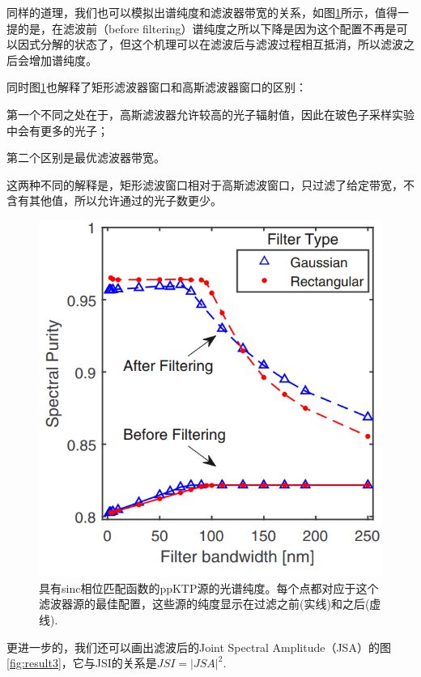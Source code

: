 同样的道理，我们也可以模拟出谱纯度和滤波器带宽的关系，如图\ref{fig:result2}所示，值得一提的是，在滤波前（before filtering）谱纯度之所以下降是因为这个配置不再是可以因式分解的状态了，但这个机理可以在滤波后与滤波过程相互抵消，所以滤波之后会增加谱纯度。

同时图\ref{fig:result2}也解释了矩形滤波器窗口和高斯滤波器窗口的区别：

第一个不同之处在于，高斯滤波器允许较高的光子辐射值，因此在玻色子采样实验中会有更多的光子；

第二个区别是最优滤波器带宽。

这两种不同的解释是，矩形滤波窗口相对于高斯滤波窗口，只过滤了给定带宽，不含有其他值，所以允许通过的光子数更少。

\begin{figure}[ht]
	\centering
	\includegraphics[scale=0.5]{pic/result2}
	\caption{具有sinc相位匹配函数的ppKTP源的光谱纯度。每个点都对应于这个滤波器源的最佳配置，这些源的纯度显示在过滤之前(实线)和之后(虚线).}
	\label{fig:result2}
\end{figure}

更进一步的，我们还可以画出滤波后的Joint Spectral Amplitude（JSA）的图\ref{fig:result3}，它与JSI的关系是$JSI=\left|JSA\right|^2$.

